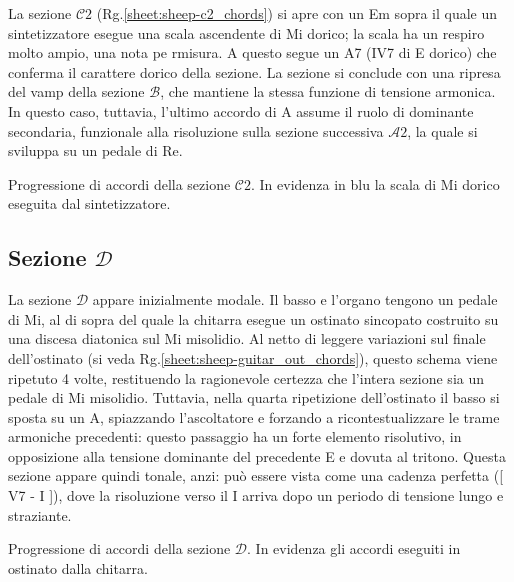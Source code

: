 \documentclass[class=book, crop=false, oneside, 12pt]{standalone}
\begin{document}
    La sezione \(\mathcal{C}2\) (Rg.\ref{sheet:sheep-c2_chords})  si apre con un Em  sopra il quale un sintetizzatore esegue una scala ascendente di Mi dorico; la scala ha un respiro molto ampio, una nota pe rmisura. A questo segue un A7 (IV7 di E dorico) che conferma il carattere dorico della sezione. La sezione si conclude con una ripresa del vamp della sezione \(\mathcal{B}\), che mantiene la stessa funzione di tensione armonica. In questo caso, tuttavia, l'ultimo accordo di A assume il ruolo di dominante secondaria, funzionale alla risoluzione sulla sezione successiva \(\mathcal{A}2\), la quale si sviluppa su un pedale di Re.

    \begin{sheet}[htbp]
        \centering
        \caption[Progressione di accordi della sezione \(\mathcal{C}2\).]{Progressione di accordi della sezione \(\mathcal{C}2\). In evidenza in blu la scala di Mi dorico eseguita dal sintetizzatore.}
        \label{sheet:sheep-c2_chords}
    \end{sheet}

    \subsection{Sezione \(\mathcal{D}\)}
    La sezione \(\mathcal{D}\) appare inizialmente modale. Il basso e l'organo tengono un pedale di Mi, al di sopra del quale la chitarra esegue un ostinato sincopato costruito su una discesa diatonica sul Mi misolidio. Al netto di leggere variazioni sul finale dell'ostinato (si veda Rg.\ref{sheet:sheep-guitar_out_chords}), questo schema viene ripetuto 4 volte, restituendo la ragionevole certezza che l'intera sezione sia un pedale di Mi misolidio. Tuttavia, nella quarta ripetizione dell'ostinato il basso si sposta su un A, spiazzando l'ascoltatore e forzando a ricontestualizzare le trame armoniche precedenti: questo passaggio ha un forte elemento risolutivo, in opposizione alla tensione dominante del precedente E e dovuta al tritono. Questa sezione appare quindi tonale, anzi: può essere vista come una cadenza perfetta ([ V7 - I ]), dove la risoluzione verso il I arriva dopo un periodo di tensione lungo e straziante.

    
    \begin{sheet}[htbp]
        \centering
        \caption{Progressione di accordi della sezione \(\mathcal{D}\). In evidenza gli accordi eseguiti in ostinato dalla chitarra.}
        \label{sheet:sheep-guitar_out_chords}
    \end{sheet}
    
\end{document}
